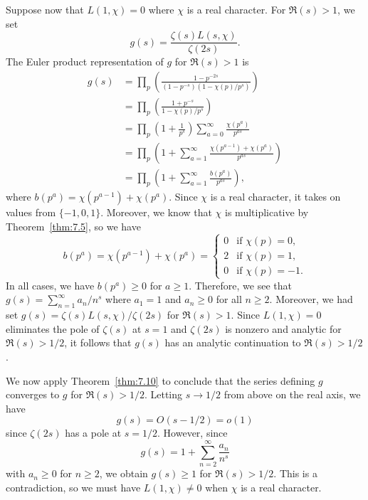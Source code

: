 \begin{pf}
    Suppose now that $L(1, \chi) = 0$ where $\chi$ is a real character. 
    For $\Re(s) > 1$, we set 
    \[ g(s) = \frac{\zeta(s) L(s, \chi)}{\zeta(2s)}. \] 
    The Euler product representation of $g$ for $\Re(s) > 1$ is 
    \begin{align*}
        g(s) &= \prod_p \left( \frac{1 - p^{-2s}}{(1 - p^{-s})(1 - \chi(p)/p^s)} \right) \\ 
        &= \prod_p \left( \frac{1 + p^{-s}}{1 - \chi(p)/p^s} \right) \\ 
        &= \prod_p \left( 1 + \frac{1}{p^s} \right) \sum_{a=0}^\infty \frac{\chi(p^a)}{p^{as}} \\ 
        &= \prod_p \left( 1 + \sum_{a=1}^\infty \frac{\chi(p^{a-1}) + \chi(p^a)}{p^{as}} \right) \\ 
        &= \prod_p \left( 1 + \sum_{a=1}^\infty \frac{b(p^a)}{p^{as}} \right), 
    \end{align*}
    where $b(p^a) = \chi(p^{a-1}) + \chi(p^a)$. Since $\chi$ is a real character, 
    it takes on values from $\{-1, 0, 1\}$. Moreover, we know that $\chi$ 
    is multiplicative by Theorem~\ref{thm:7.5}, so we have 
    \[ b(p^a) = \chi(p^{a-1}) + \chi(p^a) = 
    \begin{cases}
        0 & \text{if } \chi(p) = 0, \\ 
        2 & \text{if } \chi(p) = 1, \\ 
        0 & \text{if } \chi(p) = -1. 
    \end{cases} \] 
    In all cases, we have $b(p^a) \geq 0$ for $a \geq 1$. Therefore, we see that 
    $g(s) = \sum_{n=1}^\infty a_n/n^s$ where $a_1 = 1$ and $a_n \geq 0$ for 
    all $n \geq 2$. Moreover, we had set $g(s) = \zeta(s)L(s, \chi)/\zeta(2s)$ 
    for $\Re(s) > 1$. Since $L(1, \chi) = 0$ eliminates the pole of $\zeta(s)$
    at $s = 1$ and $\zeta(2s)$ is nonzero and analytic for $\Re(s) > 1/2$, 
    it follows that $g(s)$ has an analytic continuation to $\Re(s) > 1/2$. 

    We now apply Theorem~\ref{thm:7.10} to conclude that the series defining 
    $g$ converges to $g$ for $\Re(s) > 1/2$. Letting $s \to 1/2$ from above 
    on the real axis, we have 
    \[ g(s) = O(s - 1/2) = o(1) \] 
    since $\zeta(2s)$ has a pole at $s = 1/2$. However, since 
    \[ g(s) = 1 + \sum_{n=2}^\infty \frac{a_n}{n^s} \] 
    with $a_n \geq 0$ for $n \geq 2$, we obtain $g(s) \geq 1$ for $\Re(s) > 1/2$. 
    This is a contradiction, so we must have $L(1, \chi) \neq 0$ when 
    $\chi$ is a real character. 
\end{pf}


